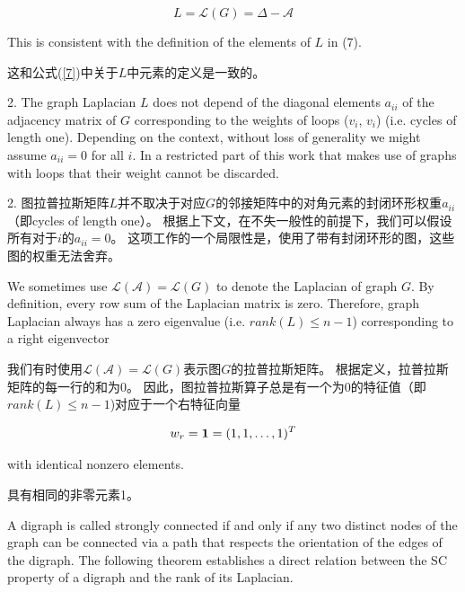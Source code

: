 \documentclass{article}
\begin{document}
\begin{equation}
    L = \mathcal{L}(G) = \Delta-\mathcal{A}
    \tag{12}
    \label{12}
\end{equation}

{\color[gray]{0.5}
\noindent This is consistent with the deﬁnition of the elements of $L$ in (7).
}

\noindent 这和公式(\ref{7})中关于$L$中元素的定义是一致的。

{\color[gray]{0.5}
 2. The graph Laplacian $L$ does not depend of the diagonal elements $a_{ii}$ of the adjacency matrix of $G$ corresponding to the weights of loops ($v_i$, $v_i$) (i.e. cycles of length one). 
Depending on the context, without loss of generality we might assume $a_{ii}=0$ for all $i$. 
In a restricted part of this work that makes use of graphs with loops that their weight cannot be discarded.
}

 2. 图拉普拉斯矩阵$L$并不取决于对应$G$的邻接矩阵中的对角元素的封闭环形权重$a_{ii}$（即cycles of length one）。
根据上下文，在不失一般性的前提下，我们可以假设所有对于$i$的$a_{ii}=0$。
这项工作的一个局限性是，使用了带有封闭环形的图，这些图的权重无法舍弃。

{\color[gray]{0.5}
We sometimes use $\mathcal{L}(\mathcal{A}) = \mathcal{L}(G)$ to denote the Laplacian of graph $G$. 
By deﬁnition, every row sum of the Laplacian matrix is zero. 
Therefore, graph Laplacian always has a zero eigenvalue (i.e. $rank(L)\le n-1$) corresponding to a right eigenvector
}

我们有时使用$\mathcal{L}(\mathcal{A}) = \mathcal{L}(G)$表示图$G$的拉普拉斯矩阵。
根据定义，拉普拉斯矩阵的每一行的和为0。
因此，图拉普拉斯算子总是有一个为0的特征值（即$rank(L)\le n-1$)对应于一个右特征向量

\begin{equation}
    w_r = \mathbf{1} = (1,1,\dots,1)^T \notag
\end{equation}

{\color[gray]{0.5}
\noindent with identical nonzero elements.
}

\noindent 具有相同的非零元素1。

{\color[gray]{0.5}
A digraph is called strongly connected if and only if any two distinct nodes of the graph can be connected via a path that respects the orientation of the edges of the digraph. 
The following theorem establishes a direct relation between the SC property of a digraph and the rank of its Laplacian.
}
\end{document}
